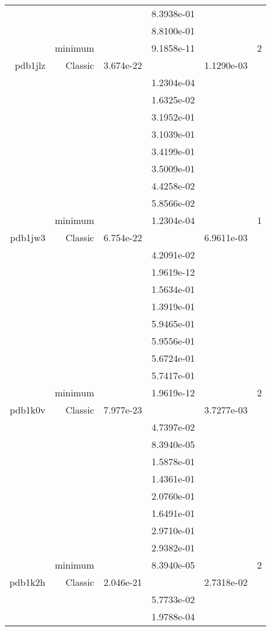 \begin{xltabular}{\textwidth}{r|rS[table-format=1.3e+2]S[table-format=1.4e+2]S[table-format=1.4e+2]S[table-format=-1.5]}
&  &  & 8.3938e-01 & & \\
&  &  & 8.8100e-01 & & \\
& minimum &  & 9.1858e-11 & & 2 \\  \addlinespace
pdb1jlz & Classic & 3.674e-22 &  & 1.1290e-03 & \\
&  &  & 1.2304e-04 & & \\
&  &  & 1.6325e-02 & & \\
&  &  & 3.1952e-01 & & \\
&  &  & 3.1039e-01 & & \\
&  &  & 3.4199e-01 & & \\
&  &  & 3.5009e-01 & & \\
&  &  & 4.4258e-02 & & \\
&  &  & 5.8566e-02 & & \\
& minimum &  & 1.2304e-04 & & 1 \\  \addlinespace
pdb1jw3 & Classic & 6.754e-22 &  & 6.9611e-03 & \\
&  &  & 4.2091e-02 & & \\
&  &  & 1.9619e-12 & & \\
&  &  & 1.5634e-01 & & \\
&  &  & 1.3919e-01 & & \\
&  &  & 5.9465e-01 & & \\
&  &  & 5.9556e-01 & & \\
&  &  & 5.6724e-01 & & \\
&  &  & 5.7417e-01 & & \\
& minimum &  & 1.9619e-12 & & 2 \\  \addlinespace
pdb1k0v & Classic & 7.977e-23 &  & 3.7277e-03 & \\
&  &  & 4.7397e-02 & & \\
&  &  & 8.3940e-05 & & \\
&  &  & 1.5878e-01 & & \\
&  &  & 1.4361e-01 & & \\
&  &  & 2.0760e-01 & & \\
&  &  & 1.6491e-01 & & \\
&  &  & 2.9710e-01 & & \\
&  &  & 2.9382e-01 & & \\
& minimum &  & 8.3940e-05 & & 2 \\  \addlinespace
pdb1k2h & Classic & 2.046e-21 &  & 2.7318e-02 & \\
&  &  & 5.7733e-02 & & \\
&  &  & 1.9788e-04 & & \\

\end{xltabular}
